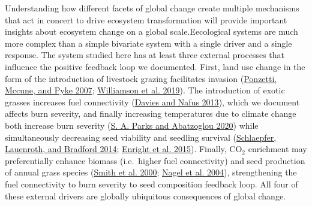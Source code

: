 \documentclass[
  12pt,
]{article}
\begin{document}
Understanding how different facets of global change create multiple
mechanisms that act in concert to drive ecosystem transformation will
provide important insights about ecosystem change on a global
scale.Eecological systems are much more complex than a simple bivariate
system with a single driver and a single response. The system studied
here has at least three external processes that influence the positive
feedback loop we documented. First, land use change in the form of the
introduction of livestock grazing facilitates invasion
(\protect\hyperlink{ref-Ponzetti2007}{Ponzetti, Mccune, and Pyke 2007};
\protect\hyperlink{ref-Williamson2019}{Williamson et al. 2019}). The
introduction of exotic grasses increases fuel connectivity
(\protect\hyperlink{ref-Davies2013}{Davies and Nafus 2013}), which we
document affects burn severity, and finally increasing temperatures due
to climate change both increase burn severity
(\protect\hyperlink{ref-Parks2020}{S. A. Parks and Abatzoglou 2020})
while simultaneously decreasing seed viability and seedling survival
(\protect\hyperlink{ref-Schlaepfer2014}{Schlaepfer, Lauenroth, and
Bradford 2014}; \protect\hyperlink{ref-Enright2015}{Enright et al.
2015}). Finally, CO\(_2\) enrichment may preferentially enhance biomass
(i.e.~higher fuel connectivity) and seed production of annual grass
species (\protect\hyperlink{ref-Smith2000}{Smith et al. 2000};
\protect\hyperlink{ref-Nagel2004}{Nagel et al. 2004}), strengthening the
fuel connectivity to burn severity to seed composition feedback loop.
All four of these external drivers are globally ubiquitous consequences
of global change.
\end{document}
